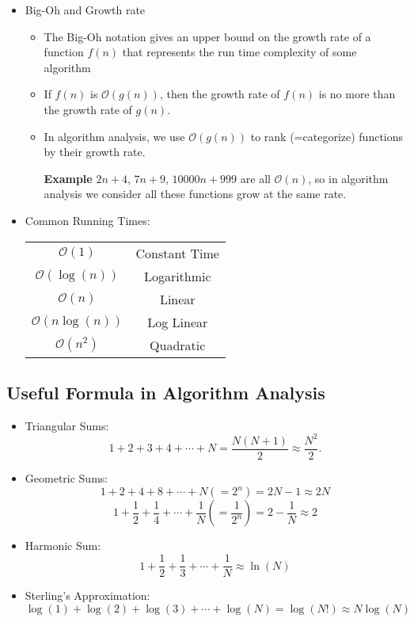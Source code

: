 \documentclass[12pt, a4paper]{article}
\newenvironment*{eg}{\par\begin{tcolorbox}\noindent\textbf{Example}\quad}{\end{tcolorbox}\par}
\newcounter{nprf}[subsection]
\newenvironment*{prf}{\par\indent\textbf{\textit{Proof \stepcounter{nprf}\thenprf.\quad}}}{\hfill$\blacksquare$\par}
\def\O{\mathcal{O}}
\begin{document}
\begin{itemize}
\begin{eg}
	$f(n)=2n+10$ is $\O(n)$. \begin{prf}For $n>10$, we have $2n+10<3n$. Therefore, we found $c=3$ and $n_0=10$ for which $f(n)\leq cg(n)$ when $n\geq n_0$.\end{prf}
	However, we know that $f(n)=n^2$ is not $\O(n)$. Picking $n=c+1$, the condition $n\leq c$ will never be satisfied. 
\end{eg}
\item Big-Oh and Growth rate
\begin{itemize}
	\item The Big-Oh notation gives an upper bound on the growth rate of a function $f(n)$ that represents the run time complexity of some algorithm
	\item If $f(n)$ is $\O(g(n))$, then the growth rate of $f(n)$ is no more than the growth rate of $g(n)$.
	\item In algorithm analysis, we use $\O(g(n))$ to rank (=categorize) functions by their growth rate. 
	\begin{eg}
		$2n+4$, $7n+9$, $10000n+999$ are all $\O(n)$, so in algorithm analysis we consider all these functions grow at the same rate. 	
	\end{eg}
\end{itemize}
\item Common Running Times: 
\begin{center}\begin{tabular}{c|c}
	$\O(1)$ & Constant Time\\
	$\O(\log(n))$ & Logarithmic\\ 
	$\O(n)$ & Linear\\
	$\O(n\log(n))$ & Log Linear\\
	$\O(n^2)$ & Quadratic
\end{tabular}\end{center}
\end{itemize}

\subsection*{Useful Formula in Algorithm Analysis}
\begin{itemize}
	\item Triangular Sums: \[1+2+3+4+\cdots+N=\dfrac{N(N+1)}{2}\approx\dfrac{N^2}{2}.\]
	\item Geometric Sums: \[1+2+4+8+\cdots+N(=2^n)=2N-1\approx 2N\]\[1+\dfrac{1}{2}+\dfrac{1}{4}+\cdots+\dfrac{1}{N}(=\dfrac{1}{2^n})=2-\dfrac{1}{N}\approx2\]
	\item Harmonic Sum: \[1+\dfrac{1}{2}+\dfrac{1}{3}+\cdots+\dfrac{1}{N}\approx\ln(N)\]
	\item Sterling's Approximation: \[\log(1)+\log(2)+\log(3)+\cdots+\log(N)=\log(N!)\approx N\log(N)\]
\end{itemize}
\end{document}
